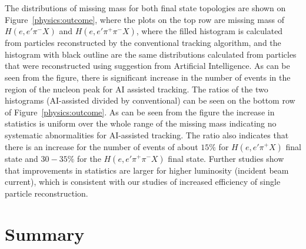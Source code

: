 The distributions of missing mass for both final state topologies are shown on Figure~\ref{physics:outcome}, where the plots 
on the top row are missing mass of $H(e,e'\pi^-X)$ and $H(e,e'\pi^+\pi^-X)$, where the filled histogram is calculated from 
particles reconstructed by the conventional tracking algorithm, and the histogram with black outline are the same distributions 
calculated from particles that were reconstructed using suggestion from Artificial Intelligence. As can be seen from the figure, 
there is significant increase in the number of events in the region of the nucleon peak for AI assisted
tracking. The ratios of the two histograms (AI-assisted divided by conventional) can be seen on the bottom row of 
Figure~\ref{physics:outcome}. As can be seen from the figure the increase in statistics is uniform over the whole range of the 
missing mass indicating no systematic abnormalities for AI-assisted tracking. The ratio also indicates that there is an increase 
for the number of events of about $15\%$ for $H(e,e'\pi^+X)$ final state and $30-35\%$ for the $H(e,e'\pi^+\pi^-X)$
final state. Further studies show that improvements in statistics are larger for higher luminosity (incident beam current), 
which is consistent with our studies of increased efficiency of single particle reconstruction.

\section{Summary}


